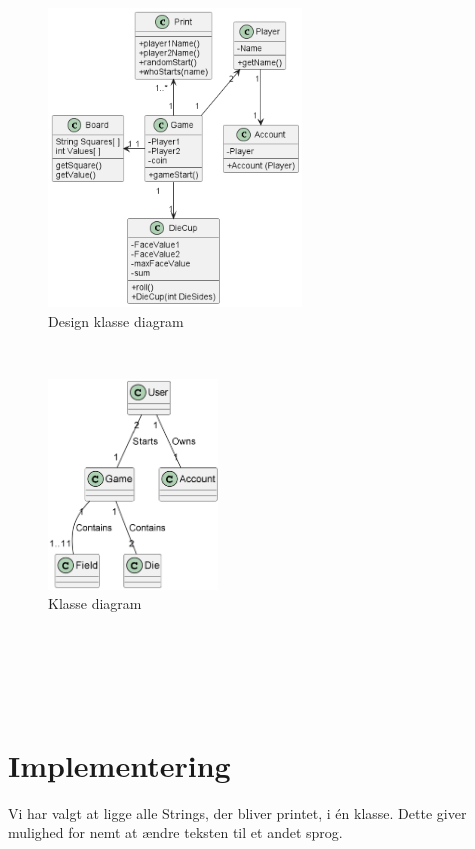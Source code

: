 \documentclass{article}
\begin{document}
\\
\begin{figure} [h]
    \centering
    \includegraphics[width = 0.6\textwidth]{Billeder/Design class diagram.png}
    \caption{Design klasse diagram}
    \label{Design klasse diagram}
\end{figure}
\\
\begin{figure} [h]
    \centering
    \includegraphics[width = 0.4\textwidth]{Billeder/Klassediagram.png}
    \caption{Klasse diagram}
    \label{Design klasse diagram}
\end{figure}
\\
\\
\\
\\
\section{Implementering}

Vi har valgt at ligge alle Strings, der bliver printet, i én klasse. Dette giver mulighed for nemt at ændre teksten til et andet sprog.\\
\end{document}
